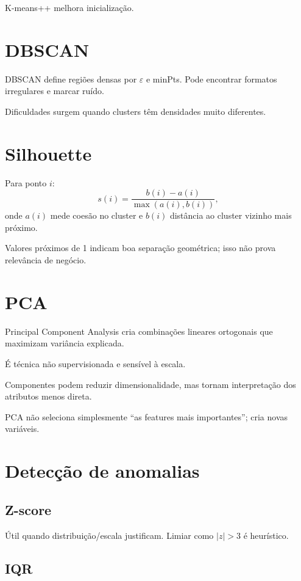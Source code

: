 K-means++ melhora inicialização.

\section{DBSCAN}

DBSCAN define regiões densas por $\varepsilon$ e minPts. Pode encontrar formatos irregulares e marcar ruído.

Dificuldades surgem quando clusters têm densidades muito diferentes.

\section{Silhouette}

Para ponto $i$:
\[
s(i)=\frac{b(i)-a(i)}{\max(a(i),b(i))},
\]
onde $a(i)$ mede coesão no cluster e $b(i)$ distância ao cluster vizinho mais próximo.

Valores próximos de 1 indicam boa separação geométrica; isso não prova relevância de negócio.

\section{PCA}

Principal Component Analysis cria combinações lineares ortogonais que maximizam variância explicada.

É técnica não supervisionada e sensível à escala.

Componentes podem reduzir dimensionalidade, mas tornam interpretação dos atributos menos direta.

PCA não seleciona simplesmente ``as features mais importantes''; cria novas variáveis.

\section{Detecção de anomalias}

\subsection{Z-score}

Útil quando distribuição/escala justificam. Limiar como $|z|>3$ é heurístico.

\subsection{IQR}

